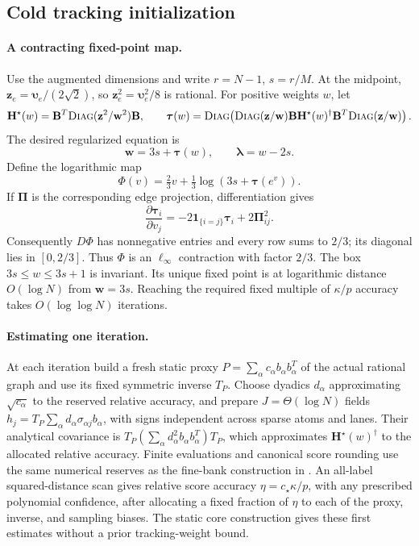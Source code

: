 \documentclass[11pt]{article}
\theoremstyle{remark}
\newcommand{\BB}{\mathbf B}
\newcommand{\HH}{\mathbf H}
\newcommand{\PPi}{\boldsymbol{\Pi}}
\newcommand{\llambda}{\boldsymbol{\lambda}}
\newcommand{\ttau}{\boldsymbol{\tau}}
\newcommand{\ww}{\mathbf w}
\newcommand{\zz}{\mathbf z}
\newcommand{\vvu}{\boldsymbol{\upsilon}}
\newcommand{\diag}{\textsc{Diag}}
\begin{document}
\subsection{Cold tracking initialization}

\paragraph{A contracting fixed-point map.}
Use the augmented dimensions and write $r=N-1$, $s=r/M$.
At the midpoint, $\zz_e=\vvu_e/(2\sqrt2)$, so $\zz_e^2=\vvu_e^2/8$ is rational.
For positive weights $w$, let
\[
 \HH^\star(w)=\BB^T\diag(\zz^2/\ww^2)\BB,\qquad
 \ttau(w)=\diag\!\left(
 \diag(\zz/\ww)\BB \HH^\star(w)^\dagger
 \BB^T\diag(\zz/\ww)\right).
\]
The desired regularized equation is
\[
              \ww=3s+\ttau(w),\qquad \llambda=w-2s .
\]
Define the logarithmic map
\[
 \Phi(v)=\tfrac23v+\tfrac13\log(3s+\ttau(e^v)).
\]
If $\PPi$ is the corresponding edge projection, differentiation gives
\[
 \frac{\partial\ttau_i}{\partial v_j}
              =-2\mathbf1_{\{i=j\}}\ttau_i+2\PPi_{ij}^2 .
\]
Consequently $D\Phi$ has nonnegative entries and every row sums to $2/3$; its
diagonal lies in $[0,2/3]$.
Thus $\Phi$ is an $\ell_\infty$ contraction with factor $2/3$.
The box $3s\le w\le3s+1$ is invariant.
Its unique fixed point is at logarithmic distance $O(\log N)$ from $\ww=3s$.
Reaching the required fixed multiple of $\kappa/p$ accuracy takes $O(\log\log
N)$ iterations.

\paragraph{Estimating one iteration.}
At each iteration build a fresh static proxy $P=\sum_\alpha c_\alpha b_\alpha
b_\alpha^T$ of the actual rational graph and use its fixed symmetric inverse
$T_P$.
Choose dyadics $d_\alpha$ approximating $\sqrt{c_\alpha}$ to the reserved
relative accuracy, and prepare $J=\Theta(\log N)$ fields $h_j=T_P\sum_\alpha
d_\alpha\sigma_{\alpha j}b_\alpha$, with signs independent across sparse atoms and
lanes.
Their analytical covariance is $T_P(\sum_\alpha d_\alpha^2b_\alpha
b_\alpha^T)T_P$, which approximates $\HH^\star(w)^\dagger$ to the allocated
relative accuracy.
Finite evaluations and canonical score rounding use the same numerical reserves
as the fine-bank construction in .
An all-label squared-distance scan gives relative score accuracy
$\eta=c_\star\kappa/p$, with any prescribed polynomial confidence, after allocating a
fixed fraction of $\eta$ to each of the proxy, inverse, and sampling biases.
The static core construction gives these first estimates without a prior
tracking-weight bound.
\end{document}
